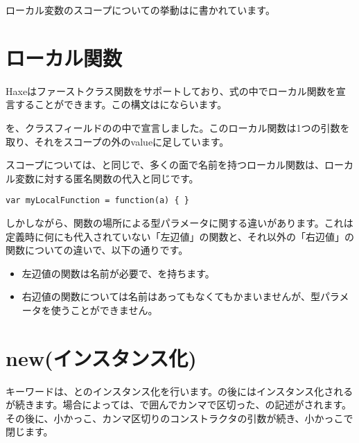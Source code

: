 ローカル変数のスコープについての挙動はに書かれています。

\section{ローカル関数}
\label{expression-function}

Haxeはファーストクラス関数をサポートしており、式の中でローカル関数を宣言することができます。この構文はにならいます。


を、クラスフィールドのの中で宣言しました。このローカル関数は1つの引数を取り、それをスコープの外のvalueに足しています。

スコープについては、と同じで、多くの面で名前を持つローカル関数は、ローカル変数に対する匿名関数の代入と同じです。

\begin{lstlisting}
var myLocalFunction = function(a) { }
\end{lstlisting}

しかしながら、関数の場所による型パラメータに関する違いがあります。これは定義時に何にも代入されていない「左辺値」の関数と、それ以外の「右辺値」の関数についての違いで、以下の通りです。

\begin{itemize}
	\item 左辺値の関数は名前が必要で、を持ちます。
	\item 右辺値の関数については名前はあってもなくてもかまいませんが、型パラメータを使うことができません。
\end{itemize}

\section{new(インスタンス化)}
\label{expression-new}

キーワードは、とのインスタンス化を行います。の後にはインスタンス化されるが続きます。場合によっては、\expr{<>}で囲んでカンマ\expr{,}で区切った、の記述がされます。その後に、小かっこ\expr{(}、カンマ\expr{,}区切りのコンストラクタの引数が続き、小かっこ\expr{)}で閉じます。

